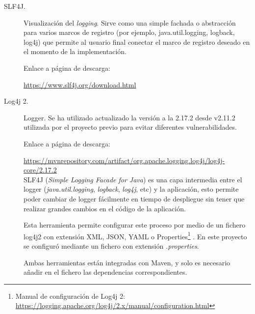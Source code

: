 \begin{description}
	\item[SLF4J.] Visualización del \textit{logging}.
	Sirve como una simple fachada o abstracción para varios marcos de registro (por ejemplo, java.util.logging, logback, log4j) que permite al usuario final conectar el marco de registro deseado en el momento de la implementación.
	
		Enlace a página de descarga:
	
		\url{https://www.slf4j.org/download.html}
	
	\item[Log4j 2.] Logger. Se ha utilizado actualizado la versión a la 2.17.2 desde v2.11.2 utilizada por el proyecto previo \cite{TFGPrevio} para evitar diferentes vulnerabilidades.
	
	 	Enlace a página de descarga:
	
	 	\url{https://mvnrepository.com/artifact/org.apache.logging.log4j/log4j-core/2.17.2}\\
	
		SLF4J (\textit{Simple Logging Facade for Java}) es una capa intermedia entre el logger (\textit{java.util.logging}, \textit{logback}, \textit{log4j}, etc) y la aplicación, esto permite poder cambiar de logger fácilmente en tiempo de despliegue sin tener que realizar grandes cambios en el código de la aplicación.
		
		Esta herramienta permite configurar este proceso por medio de un fichero log4j2 con extensión XML, JSON, YAML o Properties\footnote{Manual de configuración de Log4j 2: \url{https://logging.apache.org/log4j/2.x/manual/configuration.html}} \cite{apache_apache_nodate}. En este proyecto se configuró mediante un fichero con extensión \textit{.properties}. 
		
		Ambas herramientas están integradas con Maven, y solo es necesario añadir en el fichero  las dependencias correspondientes.
	
\end{description}
